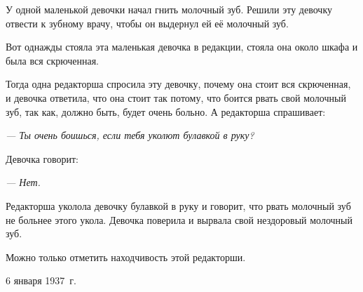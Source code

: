У одной маленькой девочки начал гнить молочный зуб. Решили эту девочку отвести к зубному врачу, чтобы он выдернул ей её молочный зуб.

Вот однажды стояла эта маленькая девочка в редакции, стояла она около шкафа и была вся скрюченная.

Тогда одна редакторша спросила эту девочку, почему она стоит вся скрюченная, и девочка ответила, что она стоит так потому, что боится рвать свой молочный зуб, так как, должно быть, будет очень больно. А редакторша спрашивает:

\textit{--- Ты очень боишься, если тебя уколют булавкой в руку?}

Девочка говорит:

\textit{--- Нет.}

Редакторша уколола девочку булавкой в руку и говорит, что рвать молочный зуб не больнее этого укола. Девочка поверила и вырвала свой нездоровый молочный зуб.

Можно только отметить находчивость этой редакторши.

\begin{flushright}
6 января 1937~г.
\end{flushright}

